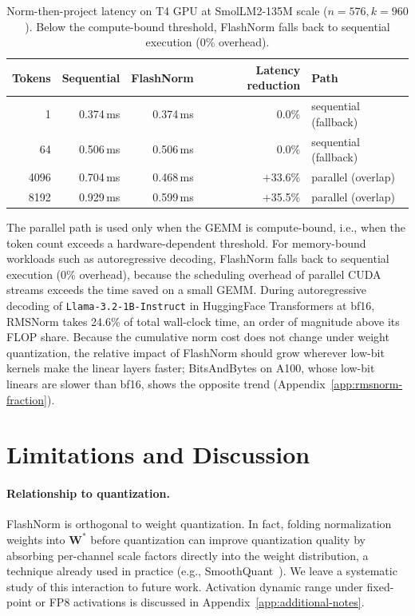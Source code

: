 \documentclass{article}
\begin{document}
\begin{table}[h!] \centering
\caption{Norm-then-project latency on T4 GPU at SmolLM2-135M scale ($n{=}576, k{=}960$). Below the compute-bound threshold, FlashNorm falls back to sequential execution (0\% overhead).}
\label{tab:overlap}
\begin{tabular}{r r r r l}
\hline
Tokens & Sequential & FlashNorm & Latency reduction & Path \\
\hline
1      & 0.374\,ms & 0.374\,ms & $0.0$\% & sequential (fallback) \\
64     & 0.506\,ms & 0.506\,ms & $0.0$\% & sequential (fallback) \\
4096   & 0.704\,ms & 0.468\,ms & $+$33.6\% & parallel (overlap) \\
8192   & 0.929\,ms & 0.599\,ms & $+$35.5\% & parallel (overlap) \\
\hline
\end{tabular}
\end{table}

The parallel path is used only when the GEMM is compute-bound, i.e., when the token count exceeds a hardware-dependent threshold. For memory-bound workloads such as autoregressive decoding, FlashNorm falls back to sequential execution (0\% overhead), because the scheduling overhead of parallel CUDA streams exceeds the time saved on a small GEMM. During autoregressive decoding of \texttt{Llama-3.2-1B-Instruct} in HuggingFace Transformers at bf16, RMSNorm takes 24.6\% of total wall-clock time, an order of magnitude above its FLOP share. Because the cumulative norm cost does not change under weight quantization, the relative impact of FlashNorm should grow wherever low-bit kernels make the linear layers faster; BitsAndBytes on A100, whose low-bit linears are slower than bf16, shows the opposite trend (Appendix~\ref{app:rmsnorm-fraction}).

\section{Limitations and Discussion}\label{sec:limitations-discussion}

\paragraph{Relationship to quantization.}
FlashNorm is orthogonal to weight quantization. In fact, folding normalization
weights into $\mathbf{W}^*$ before quantization can improve quantization quality
by absorbing per-channel scale factors directly into the weight distribution,
a technique already used in practice (e.g., SmoothQuant~\citep{smoothQuant}). We leave a systematic
study of this interaction to future work. Activation dynamic range under fixed-point or
FP8 activations is discussed in Appendix~\ref{app:additional-notes}.
\end{document}
